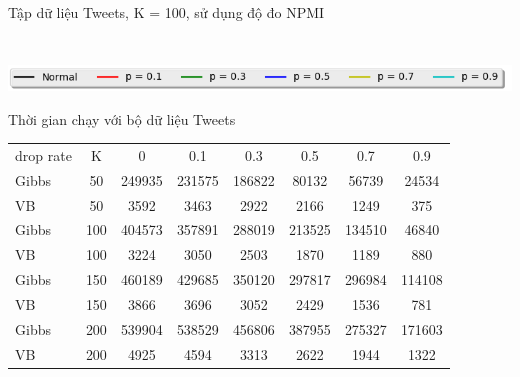 \documentclass[pdf]{beamer}
\begin{document}
\begin{frame}{Tập dữ liệu Tweets, K = 100, sử dụng độ đo NPMI }
\begin{columns}[T]
\begin{column}{.50\textwidth}
\begin{figure}
	\end{figure}				
\end{column} %
\end{columns}
\begin{center}
\includegraphics[width=1\textwidth]{menu.png}	
\end{center}
\end{frame}


\begin{frame}{Thời gian chạy với bộ dữ liệu Tweets}
		\begin{tabular}{l|c |c | c | c | c | c | c }
		drop rate & K & 0  & 0.1 & 0.3 & 0.5 & 0.7 & 0.9 \\
		 \arrayrulecolor{blue}\hline \hline
		\arrayrulecolor{black}
		Gibbs &50 & 249935& 231575 & 186822 & 80132 & 56739 & 24534 \\ 
		VB &50 & 3592& 3463 & 2922 & 2166 &1249 & 375 \\
		 \arrayrulecolor{blue}\hline \hline
		\arrayrulecolor{black}
		Gibbs &100 &404573 & 357891 & 288019 & 213525 & 134510&  46840\\ 
		VB &100 &3224 & 3050 & 2503 & 1870 &1189 &880\\
		 \arrayrulecolor{blue}\hline \hline
		\arrayrulecolor{black}
		Gibbs &150 &460189 & 429685 & 350120 & 297817 & 296984& 114108 \\ 
		VB &150 &3866 & 3696 & 3052 & 2429 &1536 &781\\
		 \arrayrulecolor{blue}\hline \hline
		\arrayrulecolor{black}
		Gibbs &200 & 539904& 538529 & 456806 & 387955 & 275327 & 171603 \\ 
		VB &200 &4925 & 4594 & 3313 & 2622 & 1944&1322
	\end{tabular}
\end{frame}
\end{document}
